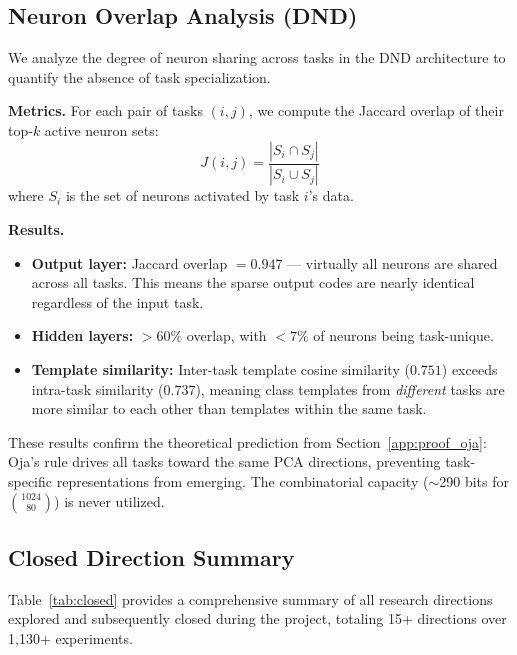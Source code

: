 \documentclass{article}
\begin{document}
\subsection{Neuron Overlap Analysis (DND)}
\label{app:overlap}

We analyze the degree of neuron sharing across tasks in the DND architecture to quantify the absence of task specialization.

\textbf{Metrics.}
For each pair of tasks $(i, j)$, we compute the Jaccard overlap of their top-$k$ active neuron sets:
\begin{equation}
    J(i, j) = \frac{|S_i \cap S_j|}{|S_i \cup S_j|}
\end{equation}
where $S_i$ is the set of neurons activated by task $i$'s data.

\textbf{Results.}
\begin{itemize}
    \item \textbf{Output layer:} Jaccard overlap $= 0.947$ --- virtually all neurons are shared across all tasks. This means the sparse output codes are nearly identical regardless of the input task.
    \item \textbf{Hidden layers:} $> 60\%$ overlap, with $< 7\%$ of neurons being task-unique.
    \item \textbf{Template similarity:} Inter-task template cosine similarity ($0.751$) exceeds intra-task similarity ($0.737$), meaning class templates from \emph{different} tasks are more similar to each other than templates within the same task.
\end{itemize}

These results confirm the theoretical prediction from Section~\ref{app:proof_oja}: Oja's rule drives all tasks toward the same PCA directions, preventing task-specific representations from emerging. The combinatorial capacity ($\sim$290 bits for $\binom{1024}{80}$) is never utilized.


\subsection{Closed Direction Summary}
\label{app:closed_directions}

Table~\ref{tab:closed} provides a comprehensive summary of all research directions explored and subsequently closed during the project, totaling 15+ directions over 1,130+ experiments.
\end{document}
